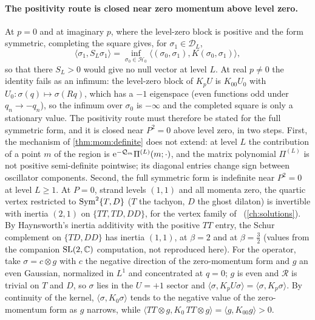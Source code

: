 \paragraph{The positivity route is closed near zero momentum above level zero.}
At $p = 0$ and at imaginary $p$, where the level-zero block is positive and the form symmetric, completing the square gives, for $\sigma_1 \in \mathcal D_L$,
\begin{equation}
  \label{eq:mom:variational}
  \langle \sigma_1, S_L \sigma_1 \rangle
    = \inf_{\sigma_0 \in \mathcal H_0} \big\langle (\sigma_0, \sigma_1), K (\sigma_0, \sigma_1) \big\rangle,
\end{equation}
so that there $S_L > 0$ would give no null vector at level $L$.
At real $p \ne 0$ the identity fails as an infimum: the level-zero block of $K_p U$ is $K_{00} U_0$ with $U_0: \sigma(q) \mapsto \sigma(R q)$, which has a $-1$ eigenspace (even functions odd under $q_n \to - q_n$), so the infimum over $\sigma_0$ is $- \infty$ and the completed square is only a stationary value.
The positivity route must therefore be stated for the full symmetric form, and it is closed near $P^2 = 0$ above level zero, in two steps.
First, the mechanism of \cref{thm:mom:definite} does not extend: at level $L$ the contribution of a point $m$ of the region is $\mathrm{e}^{- \mathcal Q_m} \Pi^{(L)}(m; \cdot)$, and the matrix polynomial $\Pi^{(L)}$ is not positive semi-definite pointwise; its diagonal entries change sign between oscillator components.
Second, the full symmetric form is indefinite near $P^2 = 0$ at level $L \ge 1$.
At $P = 0$, strand levels $(1, 1)$ and all momenta zero, the quartic vertex restricted to $\operatorname{Sym}^2 \{T, D\}$ ($T$ the tachyon, $D$ the ghost dilaton) is invertible with inertia $(2, 1)$ on $\{TT, TD, DD\}$, for the vertex family of~\cite{Erbin:2026:SL2CVerticesClosed} (\cref{ch:solutions}).
By Haynsworth's inertia additivity with the positive $TT$ entry, the Schur complement on $\{TD, DD\}$ has inertia $(1, 1)$, at $\beta = 2$ and at $\beta = \tfrac{3}{2}$ (values from the companion $\mathrm{SL}(2, \mathbb{C})$ computation, not reproduced here).
For the operator, take $\sigma = c \otimes g$ with $c$ the negative direction of the zero-momentum form and $g$ an even Gaussian, normalized in $L^1$ and concentrated at $q = 0$; $g$ is even and $\mathcal R$ is trivial on $T$ and $D$, so $\sigma$ lies in the $U = + 1$ sector and $\langle \sigma, K_p U \sigma \rangle = \langle \sigma, K_p \sigma \rangle$.
By continuity of the kernel, $\langle \sigma, K_0 \sigma \rangle$ tends to the negative value of the zero-momentum form as $g$ narrows, while $\langle TT \otimes g, K_0 \, TT \otimes g \rangle = \langle g, K_{00} g \rangle > 0$.
